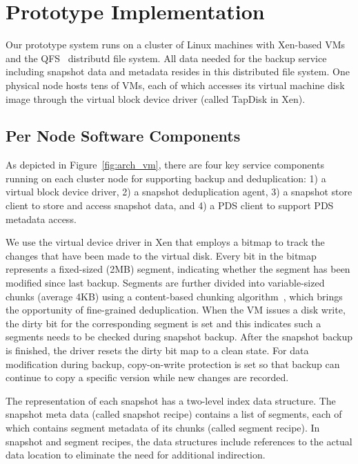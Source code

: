 \section{Prototype Implementation}
\label{sect:architecture}

Our prototype system runs on a cluster of Linux machines with Xen-based VMs 
and the QFS~\cite{michael2013} distributd file system. 
All data needed for the backup service including snapshot data and metadata
resides in this distributed file system. 
One physical node hosts tens of VMs, each of which accesses its virtual machine disk image through the
virtual block device driver (called TapDisk\cite{Warfield2005} in Xen).

\subsection{Per Node Software Components} 
As depicted in Figure~\ref{fig:arch_vm}, 
there are four key service components running on each cluster
node  for supporting backup and deduplication: 
1) a virtual block device driver, 2) a snapshot deduplication agent,
3) a snapshot store client to store  and access snapshot data,
and 4)  a PDS client to support PDS metadata access. 

We use the virtual device driver in Xen that employs a bitmap to track the changes 
that have been made to the virtual disk.
Every bit in the bitmap represents a fixed-sized (2MB) segment, indicating whether the segment
has been modified since last backup. 
Segments are further divided into variable-sized chunks (average 4KB) 
using a content-based chunking algorithm~\cite{frame05}, 
which brings the opportunity of fine-grained deduplication.
When the VM issues a disk write, the dirty bit for the corresponding segment is set
and this indicates such a segments needs to be checked during snapshot backup. 
After the snapshot backup is finished, the driver resets the dirty bit map to a clean state.
For data modification during backup, copy-on-write protection is set so that backup can continue to
copy  a specific version while new changes are recorded.

The representation of each snapshot has  a two-level index data structure.
The snapshot meta data (called snapshot recipe) contains a list of segments, each of which contains segment
metadata of its chunks (called segment recipe).
In snapshot and segment recipes, 
the data structures  include references to the actual data location to eliminate the need for additional indirection.

